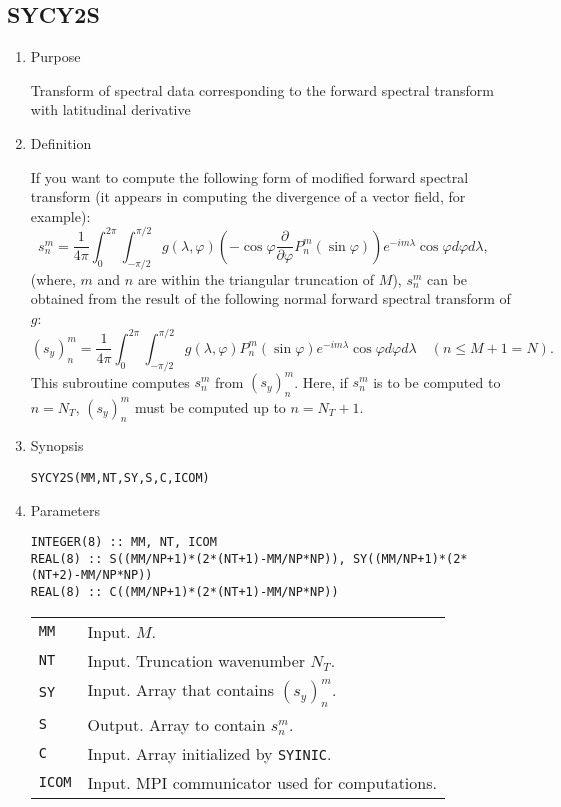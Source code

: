 \documentclass[a4paper]{scrartcl}
\begin{document}

\subsection{SYCY2S}

\begin{enumerate}

\item Purpose

Transform of spectral data 
corresponding to the forward spectral transform with latitudinal derivative

\item Definition

If you want to compute the following form of modified forward
spectral transform
(it appears in computing the divergence of a vector field, for example):
\begin{equation}
s^m_n=\frac1{4\pi}\int^{2\pi}_0\int^{\pi/2}_{-\pi/2}
g(\lambda,\varphi)
\left(-\cos\varphi\frac{\partial}{\partial\varphi}P^m_n(\sin\varphi)\right)
e^{-im\lambda}\cos\varphi d\varphi
d\lambda,
\quad 
\end{equation}
(where, $m$ and $n$ are within the triangular truncation of $M$),
$s^m_n$ can be obtained from the result of 
the following normal forward spectral
transform of $g$:
\begin{equation}
(s_y)^m_n=\frac1{4\pi}\int^{2\pi}_0\int^{\pi/2}_{-\pi/2}
g(\lambda,\varphi)
P^m_n(\sin\varphi)
e^{-im\lambda}\cos\varphi d\varphi
d\lambda
\quad (n\le M+1=N).
\end{equation}
This subroutine computes $s^m_n$ from $(s_y)^m_n$.
Here, if $s^m_n$ is to be computed to $n=N_T$, $(s_y)^m_n$
must be computed up to  $n=N_T+1$.

\item Synopsis 

\texttt{SYCY2S(MM,NT,SY,S,C,ICOM)}
  
\item Parameters

\begin{verbatim}
INTEGER(8) :: MM, NT, ICOM
REAL(8) :: S((MM/NP+1)*(2*(NT+1)-MM/NP*NP)), SY((MM/NP+1)*(2*(NT+2)-MM/NP*NP))
REAL(8) :: C((MM/NP+1)*(2*(NT+1)-MM/NP*NP))
\end{verbatim}

\begin{tabular}{ll}
\texttt{MM} & Input. $M$.\\  
\texttt{NT} & Input. Truncation wavenumber $N_T$.\\
\texttt{SY} & Input. Array that contains $(s_y)^m_n$.\\
\texttt{S} & Output. Array to contain $s^m_n$.\\
\texttt{C} & Input. Array initialized by  \texttt{SYINIC}.\\
\texttt{ICOM} & Input. MPI communicator used for computations.
\end{tabular}


\end{enumerate}
\end{document}
